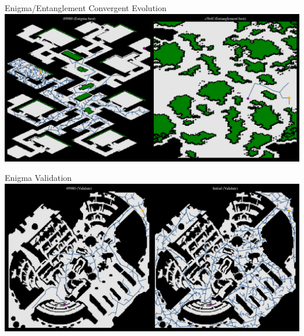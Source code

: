 \documentclass[aspectratio=169]{beamer}
\begin{document}
\begin{frame}{Enigma/Entanglement Convergent Evolution}
    \includegraphics[width=1.0\linewidth, keepaspectratio]{figures/learned_split_1.pdf}
\end{frame}

\begin{frame}{Enigma Validation}
    \includegraphics[width=1.0\linewidth, keepaspectratio]{figures/learned_split_2.pdf}
\end{frame}
\end{document}
